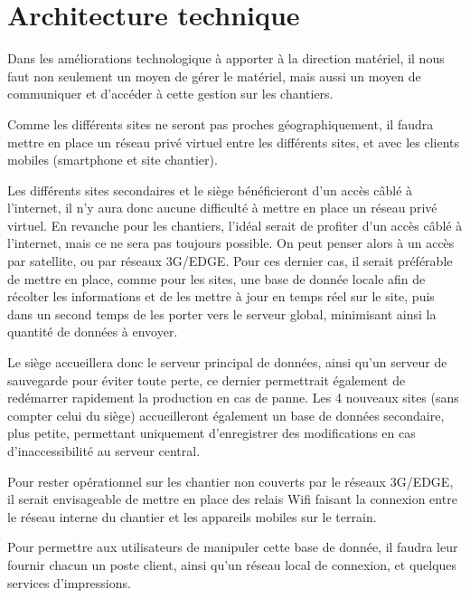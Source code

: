 \section{Architecture technique}

    Dans les améliorations technologique à apporter à la direction matériel, il nous faut non seulement un moyen de gérer le matériel, mais aussi un moyen de communiquer et d'accéder à cette gestion sur les chantiers.

    Comme les différents sites ne seront pas proches géographiquement, il faudra mettre en place un réseau privé virtuel entre les différents sites, et avec les clients mobiles (smartphone et site chantier).

    Les différents sites secondaires et le siège bénéficieront d'un accès câblé à l'internet, il n'y aura donc aucune difficulté à mettre en place un réseau privé virtuel.
    En revanche pour les chantiers, l'idéal serait de profiter d'un accès câblé à l'internet, mais ce ne sera pas toujours possible. On peut penser alors à un accès par satellite, ou par réseaux 3G/EDGE. Pour ces dernier cas, il serait préférable de mettre en place, comme pour les sites, une base de donnée locale afin de récolter les informations et de les mettre à jour en temps réel sur le site, puis dans un second temps de les porter vers le serveur global, minimisant ainsi la quantité de données à envoyer.

    Le siège accueillera donc le serveur principal de données, ainsi qu'un serveur de sauvegarde pour éviter toute perte, ce dernier permettrait également de redémarrer rapidement la production en cas de panne. Les 4 nouveaux sites (sans compter celui du siège) accueilleront également un base de données secondaire, plus petite, permettant uniquement d'enregistrer des modifications en cas d'inaccessibilité au serveur central.

    Pour rester opérationnel sur les chantier non couverts par le réseaux 3G/EDGE, il serait envisageable de mettre en place des relais Wifi faisant la connexion entre le réseau interne du chantier et les appareils mobiles sur le terrain.

    Pour permettre aux utilisateurs de manipuler cette base de donnée, il faudra leur fournir chacun un poste client, ainsi qu'un réseau local de connexion, et quelques services d'impressions.



